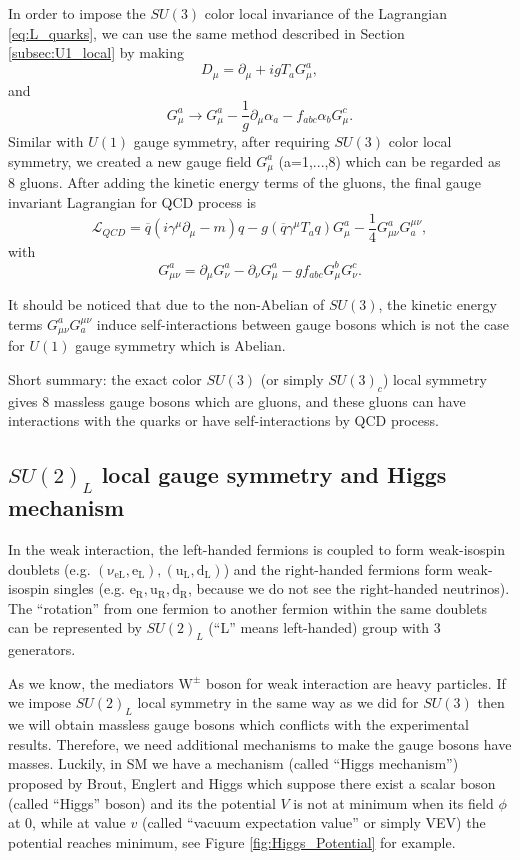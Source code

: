 In order to impose the $SU(3)$ color local invariance of the Lagrangian \ref{eq:L_quarks}, we can use the same method described in Section \ref{subsec:U1_local} by making
\begin{equation}
D_\mu=\partial_\mu+igT_aG_\mu^{a},
\label{eq:D_mu_Color}
\end{equation}
and 
\begin{equation}
G^{a}_\mu\rightarrow G^{a}_\mu - \frac{1}{g}\partial_\mu\alpha_a-f_{abc}\alpha_bG_\mu^{c}.
\label{eq:G_Color}
\end{equation}
Similar with $U(1)$ gauge symmetry, after requiring $SU(3)$ color local symmetry, we created a new gauge field $G_\mu^{a}$ (a=1,...,8) which can be regarded as 8 gluons. After adding the kinetic energy terms of the gluons, the final gauge invariant Lagrangian for QCD process is
\begin{equation}
\mathcal{L}_{QCD}=\overline{q}(i\gamma^{\mu}\partial_\mu-m)q-g(\overline{q}\gamma^{\mu}T_a q) G_\mu^{a}-\frac{1}{4}G^{a}_{\mu\nu}G^{\mu\nu}_a,
\label{eq:L_QCD}
\end{equation}
with
$$G^{a}_{\mu\nu}=\partial_\mu G_\nu^{a}-\partial_\nu G_\mu^{a}-gf_{abc}G_\mu^{b}G_\nu^{c}.$$

It should be noticed that due to the non-Abelian of $SU(3)$, the kinetic energy terms $G^{a}_{\mu\nu}G^{\mu\nu}_a$ induce self-interactions between gauge bosons which is not the case for $U(1)$ gauge symmetry which is Abelian.

Short summary: the exact color $SU(3)$ (or simply $SU(3)_c$) local symmetry gives 8 massless gauge bosons which are gluons, and these gluons can have interactions with the quarks or have self-interactions by QCD process.


\subsection{$SU(2)_L$ local gauge symmetry and Higgs mechanism}\label{subsec:Higgs_U2_local}

In the weak interaction, the left-handed fermions is coupled to form weak-isospin doublets (e.g. $\mathrm{(\nu_{eL}, e_L), (u_L, d_L)}$) and the right-handed fermions form weak-isospin singles (e.g. $\mathrm{e_R, u_R, d_R}$, because we do not see the right-handed neutrinos). The ``rotation'' from one fermion to another fermion within the same doublets can be represented by $SU(2)_L$ (``L'' means left-handed) group with 3 generators.

As we know, the mediators $\mathrm{W^{\pm}}$ boson for weak interaction are heavy particles. If we impose $SU(2)_L$ local symmetry in the same way as we did for $SU(3)$ then we will obtain massless gauge bosons which conflicts with the experimental results. Therefore, we need additional mechanisms to make the gauge bosons have masses. Luckily, in SM we have a mechanism (called ``Higgs mechanism'') proposed by Brout, Englert and Higgs \cite{PhysRevLett.13.321,HIGGS1964132,PhysRevLett.13.508} which suppose there exist a scalar boson (called ``Higgs'' boson) and its the potential $V$ is not at minimum when its field $\phi$ at 0, while at value $v$ (called ``vacuum expectation value'' or simply VEV) the potential reaches minimum, see Figure \ref{fig:Higgs_Potential} for example.

